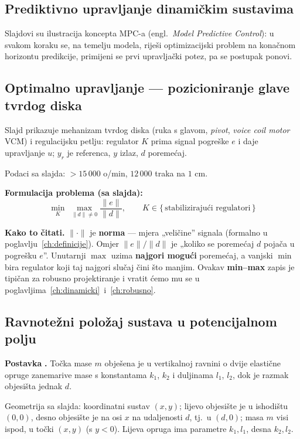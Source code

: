 \subsection{Prediktivno upravljanje dinamičkim sustavima}

Slajdovi su ilustracija koncepta MPC-a (engl.\ \emph{Model Predictive
Control}): u svakom koraku se, na temelju modela, riješi optimizacijski problem
na konačnom horizontu predikcije, primijeni se prvi upravljački potez, pa se
postupak ponovi.

\subsection{Optimalno upravljanje --- pozicioniranje glave tvrdog diska}

Slajd prikazuje mehanizam tvrdog diska (ruka s glavom, \emph{pivot},
\emph{voice coil motor} VCM) i regulacijsku petlju: regulator $K$ prima signal
pogreške $e$ i daje upravljanje $u$; $y_r$ je referenca, $y$ izlaz, $d$
poremećaj.

Podaci sa slajda: ${>}15\,000$ o/min, $12\,000$ traka na $1$ cm.

\textbf{Formulacija problema (sa slajda):}
\begin{equation}
\min_K \; \max_{\|d\| \ne 0} \frac{\|e\|}{\|d\|}, \qquad
K \in \{\,\text{stabilizirajući regulatori}\,\}
\end{equation}

\textbf{Kako to čitati.} $\|\cdot\|$ je \textbf{norma} --- mjera „veličine”
signala (formalno u poglavlju~\ref{ch:definicije}). Omjer $\|e\|/\|d\|$ je
„koliko se poremećaj $d$ pojača u pogrešku $e$”. Unutarnji $\max$ uzima
\textbf{najgori mogući} poremećaj, a vanjski $\min$ bira regulator koji taj
najgori slučaj čini što manjim. Ovakav \textbf{min--max} zapis je tipičan za
robusno projektiranje i vratit ćemo mu se u
poglavljima~\ref{ch:dinamicki}~i~\ref{ch:robusno}.

\subsection{Ravnotežni položaj sustava u potencijalnom polju}

\textbf{Postavka} \textbf{.} Točka mase $m$ obješena je u vertikalnoj
ravnini o dvije elastične opruge zanemarive mase s konstantama $k_1$, $k_2$ i
duljinama $l_1$, $l_2$, dok je razmak objesišta jednak $d$.

Geometrija sa slajda: koordinatni sustav $(x, y)$; lijevo objesište je u
ishodištu $(0,0)$, desno objesište je na osi $x$ na udaljenosti $d$, tj.\ u
$(d, 0)$; masa $m$ visi ispod, u točki $(x, y)$ (s $y < 0$). Lijeva opruga ima
parametre $k_1, l_1$, desna $k_2, l_2$.

